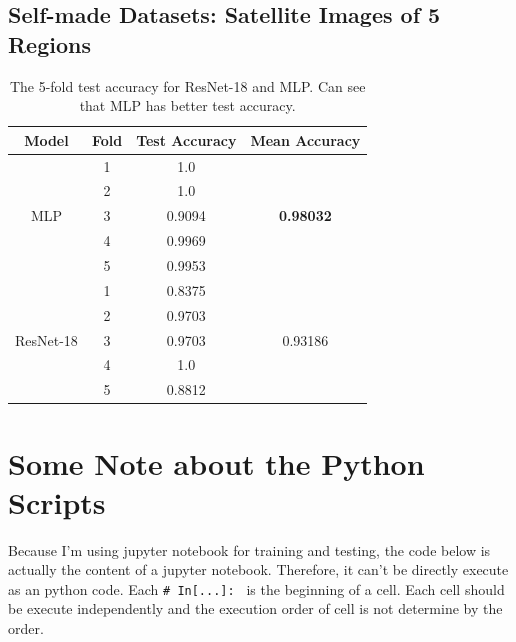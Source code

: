 \documentclass[twocolumn]{extarticle}
\begin{document}
\begin{appendices}
\subsection{Self-made Datasets: Satellite Images of 5 Regions}

\begin{table}[H]
\centering
\caption{The 5-fold test accuracy for ResNet-18 and MLP. Can see that MLP has better test accuracy.}
\label{tab:terrain-comp}
\begin{tabular}{@{}cccc@{}}
\toprule
Model                      & Fold & Test Accuracy & Mean Accuracy            \\ \midrule
\multirow{5}{*}{MLP}       & 1    & 1.0           & \multirow{5}{*}{\textbf{0.98032}} \\
                           & 2    & 1.0           &                          \\
                           & 3    & 0.9094        &                          \\
                           & 4    & 0.9969        &                          \\
                           & 5    & 0.9953        &                          \\ \midrule
\multirow{5}{*}{ResNet-18} & 1    & 0.8375        & \multirow{5}{*}{0.93186} \\
                           & 2    & 0.9703        &                          \\
                           & 3    & 0.9703        &                          \\
                           & 4    & 1.0           &                          \\
                           & 5    & 0.8812        &                          \\ \bottomrule
\end{tabular}
\end{table}

\section{Some Note about the Python Scripts}

Because I'm using jupyter notebook for training and testing, the code below is actually the content of a jupyter notebook. Therefore, it can't be directly execute as an python code. Each \texttt{\# In[...]: } is the beginning of a cell. Each cell should be execute independently and the execution order of cell is not determine by the order.


\end{appendices}
\end{document}
